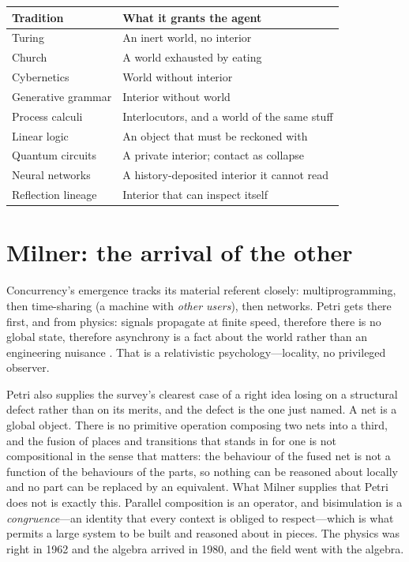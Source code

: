 \documentclass[11pt,a4paper]{article}
\begin{document}
\begin{center}
\begin{tabular}{@{}ll@{}}
\toprule
\textbf{Tradition} & \textbf{What it grants the agent} \\
\midrule
Turing & An inert world, no interior \\
Church & A world exhausted by eating \\
Cybernetics & World without interior \\
Generative grammar & Interior without world \\
Process calculi & Interlocutors, and a world of the same stuff \\
Linear logic & An object that must be reckoned with \\
Quantum circuits & A private interior; contact as collapse \\
Neural networks & A history-deposited interior it cannot read \\
Reflection lineage & Interior that can inspect itself \\
\bottomrule
\end{tabular}
\end{center}

\section{Milner: the arrival of the other}
\label{sec:milner}

Concurrency's emergence tracks its material referent closely: multiprogramming,
then time-sharing (a machine with \emph{other users}), then networks. Petri gets
there first, and from physics: signals propagate at finite speed, therefore there
is no global state, therefore asynchrony is a fact about the world rather than an
engineering nuisance \cite{petri1962}. That is a relativistic psychology---locality,
no privileged observer.

Petri also supplies the survey's clearest case of a right idea losing on a
structural defect rather than on its merits, and the defect is the one just
named. A net is a global object. There is no primitive operation composing two
nets into a third, and the fusion of places and transitions that stands in for
one is not compositional in the sense that matters: the behaviour of the fused
net is not a function of the behaviours of the parts, so nothing can be reasoned
about locally and no part can be replaced by an equivalent. What Milner supplies
that Petri does not is exactly this. Parallel composition is an operator, and
bisimulation is a \emph{congruence}---an identity that every context is obliged
to respect---which is what permits a large system to be built and reasoned about
in pieces. The physics was right in 1962 and the algebra arrived in 1980, and the
field went with the algebra.
\end{document}
